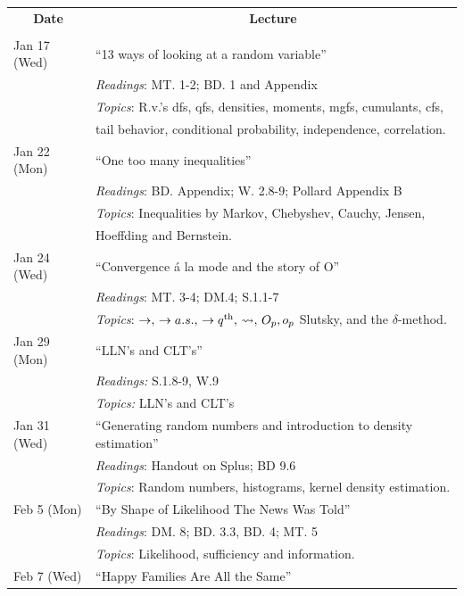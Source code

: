 \vspace{10mm}
\begin{tabular}{ll}
\multicolumn{1}{c}{\bf Date} &  \multicolumn{1}{c}{\bf Lecture} \\
 &  \\
Jan 17 (Wed) & ``13 ways of looking at a random variable''\\
& {\it Readings}: MT. 1-2; BD. 1 and Appendix \\
& {\it Topics}:  R.v.'s dfs, qfs, densities, moments, mgfs, cumulants, cfs, \\
&  tail behavior, conditional probability, independence, correlation.\\
Jan 22 (Mon) &  ``One too many inequalities''\\
& {\it Readings}: BD. Appendix; W. 2.8-9; Pollard Appendix B \\
& {\it Topics}:  Inequalities by Markov, Chebyshev, Cauchy, Jensen, \\
& Hoeffding and Bernstein. \\
Jan 24 (Wed) & ``Convergence \'{a} la mode and the story of O''\\
& {\it Readings}: MT. 3-4; DM.4; S.1.1-7 \\
& {\it Topics}: $\rightarrow, \, \rightarrow a.s., \, \rightarrow q^{\rm {th}}, \, \leadsto , \, O_p , o_p$  Slutsky, and the $\delta$-method. \\
Jan 29 (Mon) & ``LLN's and CLT's'' \\
& {\it Readings:} S.1.8-9, W.9 \\
& {\it Topics:} LLN's and CLT's \\
Jan 31 (Wed) & ``Generating random numbers and introduction to density estimation'' \\
& {\it Readings}: Handout on Splus; BD 9.6 \\
& {\it Topics}: Random numbers, histograms, kernel density estimation. \\
Feb 5 (Mon) & ``By Shape of Likelihood The News Was Told''\\
& {\it Readings}: DM. 8; BD. 3.3, BD. 4; MT. 5 \\
& {\it Topics}:  Likelihood, sufficiency and information.\\
Feb 7 (Wed) &  ``Happy Families Are All the Same''\\

\end{tabular}
